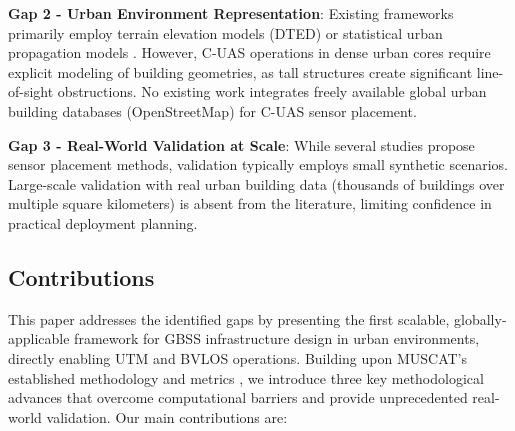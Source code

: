 \textbf{Gap 2 - Urban Environment Representation}: Existing frameworks primarily employ terrain elevation models (DTED) \cite{muscat2023} or statistical urban propagation models \cite{3gpp38901}. However, C-UAS operations in dense urban cores require explicit modeling of building geometries, as tall structures create significant line-of-sight obstructions. No existing work integrates freely available global urban building databases (OpenStreetMap) for C-UAS sensor placement.

\textbf{Gap 3 - Real-World Validation at Scale}: While several studies propose sensor placement methods, validation typically employs small synthetic scenarios. Large-scale validation with real urban building data (thousands of buildings over multiple square kilometers) is absent from the literature, limiting confidence in practical deployment planning.

\subsection{Contributions}

This paper addresses the identified gaps by presenting the first scalable, globally-applicable framework for GBSS infrastructure design in urban environments, directly enabling UTM and BVLOS operations. Building upon MUSCAT's established methodology and metrics \cite{muscat2023}, we introduce three key methodological advances that overcome computational barriers and provide unprecedented real-world validation. Our main contributions are:

